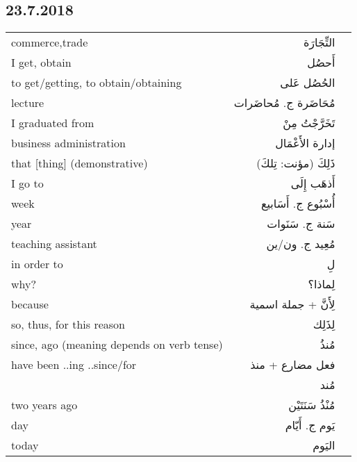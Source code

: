 \documentclass[a4paper]{article}
\begin{document}
\subsection{23.7.2018}
\begin{tabular}{lrr}
commerce,trade  & التِّجَارَة &  \\
I get, obtain  & أَحصُل &  \\
to get/getting, to obtain/obtaining  & الحُصُل عَلى &  \\
lecture  & مُحَاضَرة  ج. مُحاضَرات &  \\
I graduated from  & تَخَرَّجْتُ مِنْ &  \\
business administration  & إدارة الأَعْمَال &  \\
that [thing] (demonstrative)  & ذَلِكَ (مؤنت: تِلكَ) &  \\
I go to  & أَذهَب إِلَى &  \\
week  & أُسْبُوع ج. أَسَابيع &  \\
year  & سَنة ج. سَنَوات &  \\
teaching assistant  & مُعِيد ج. ون/ين &  \\
in order to  & لِ &  \\
why?  & لِماذا؟ &  \\
because  & لِأَنَّ + جملة اسمية &  \\
so, thus, for this reason  & لِذَلِك &  \\
since, ago (meaning depends on verb tense)  & مُنذُ &  \\
have been ..ing ..since/for & فعل مضارع  + منذ &  \\
  & مُند &  \\
two years ago  & مُنْذُ سَنَتَيْن &  \\
day  & يَوم ج. أَيّام &  \\
today  & اليَوم & \\
\end{tabular}
\end{document}
